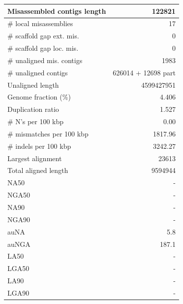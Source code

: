 \documentclass[12pt,a4paper]{article}
\begin{document}
\begin{table}[ht]
\begin{center}
\begin{tabular}{|l*{1}{|r}|}
Misassembled contigs length & 122821 \\ \hline
\# local misassemblies & 17 \\ \hline
\# scaffold gap ext. mis. & 0 \\ \hline
\# scaffold gap loc. mis. & 0 \\ \hline
\# unaligned mis. contigs & 1983 \\ \hline
\# unaligned contigs & 626014 + 12698 part \\ \hline
Unaligned length & 4599427951 \\ \hline
Genome fraction (\%) & 4.406 \\ \hline
Duplication ratio & 1.527 \\ \hline
\# N's per 100 kbp & 0.00 \\ \hline
\# mismatches per 100 kbp & 1817.96 \\ \hline
\# indels per 100 kbp & 3242.27 \\ \hline
Largest alignment & 23613 \\ \hline
Total aligned length & 9594944 \\ \hline
NA50 & - \\ \hline
NGA50 & - \\ \hline
NA90 & - \\ \hline
NGA90 & - \\ \hline
auNA & 5.8 \\ \hline
auNGA & 187.1 \\ \hline
LA50 & - \\ \hline
LGA50 & - \\ \hline
LA90 & - \\ \hline
LGA90 & - \\ \hline
\end{tabular}
\end{center}
\end{table}
\end{document}
